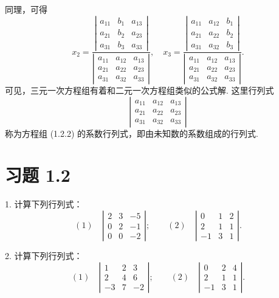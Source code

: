 \documentclass[UTF8,12pt,a4paper,fontset=fandol]{ctexart}
\begin{document}
同理，可得
\[
x_2=
\frac{
\left|\begin{array}{ccc}
a_{11} & b_1 & a_{13}\\
a_{21} & b_2 & a_{23}\\
a_{31} & b_3 & a_{33}
\end{array}\right|}
{\left|\begin{array}{ccc}
a_{11} & a_{12} & a_{13}\\
a_{21} & a_{22} & a_{23}\\
a_{31} & a_{32} & a_{33}
\end{array}\right|},\quad
x_3=
\frac{
\left|\begin{array}{ccc}
a_{11} & a_{12} & b_1\\
a_{21} & a_{22} & b_2\\
a_{31} & a_{32} & b_3
\end{array}\right|}
{\left|\begin{array}{ccc}
a_{11} & a_{12} & a_{13}\\
a_{21} & a_{22} & a_{23}\\
a_{31} & a_{32} & a_{33}
\end{array}\right|}.
\]
可见，三元一次方程组有着和二元一次方程组类似的公式解. 这里行列式
\[
\left|\begin{array}{ccc}
a_{11} & a_{12} & a_{13}\\
a_{21} & a_{22} & a_{23}\\
a_{31} & a_{32} & a_{33}
\end{array}\right|
\]
称为方程组 (1.2.2) 的系数行列式，即由未知数的系数组成的行列式.

\section*{习题 1.2}

1. 计算下列行列式：
\[
(1)\quad
\left|\begin{array}{ccc}
2 & 3 & -5\\
0 & 2 & -1\\
0 & 0 & -2
\end{array}\right|;\qquad
(2)\quad
\left|\begin{array}{ccc}
0 & 1 & 2\\
2 & 1 & 1\\
-1 & 3 & 1
\end{array}\right|.
\]

2. 计算下列行列式：
\[
(1)\quad
\left|\begin{array}{ccc}
1 & 2 & 3\\
2 & 4 & 6\\
-3 & 7 & -2
\end{array}\right|;\qquad
(2)\quad
\left|\begin{array}{ccc}
0 & 2 & 4\\
2 & 1 & 1\\
-1 & 3 & 1
\end{array}\right|.
\]
\end{document}
